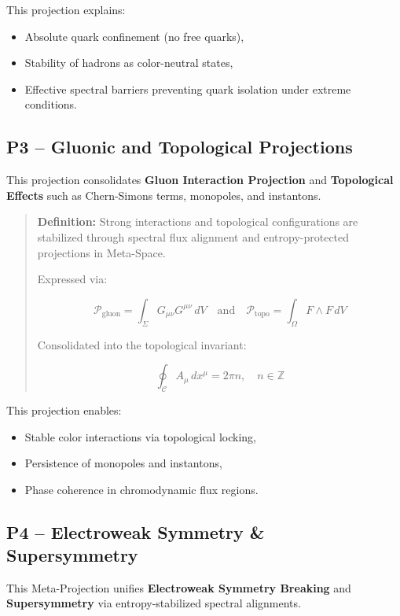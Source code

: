 \documentclass[10.5pt,a4paper]{article}
\begin{document}
This projection explains:
\begin{itemize}
    \item Absolute quark confinement (no free quarks),
    \item Stability of hadrons as color-neutral states,
    \item Effective spectral barriers preventing quark isolation under extreme conditions.
\end{itemize}

\subsection{P3 – Gluonic and Topological Projections}

This projection consolidates \textbf{Gluon Interaction Projection} and 
\textbf{Topological Effects} such as Chern-Simons terms, monopoles, and instantons.

\begin{quote}
\textbf{Definition:}  
Strong interactions and topological configurations are stabilized through spectral flux alignment 
and entropy-protected projections in Meta-Space.

Expressed via:

\[
\mathcal{P}_{\text{gluon}} = \int_\Sigma G_{\mu\nu} G^{\mu\nu} \, dV \quad \text{and} \quad \mathcal{P}_{\text{topo}} = \int_\Omega F \wedge F \, dV
\]

Consolidated into the topological invariant:

\[
\oint_{\mathcal{C}} A_\mu \, dx^\mu = 2\pi n, \quad n \in \mathbb{Z}
\]
\end{quote}

This projection enables:
\begin{itemize}
    \item Stable color interactions via topological locking,
    \item Persistence of monopoles and instantons,
    \item Phase coherence in chromodynamic flux regions.
\end{itemize}

\subsection{P4 – Electroweak Symmetry \& Supersymmetry}

This Meta-Projection unifies \textbf{Electroweak Symmetry Breaking} and \textbf{Supersymmetry} 
via entropy-stabilized spectral alignments.
\end{document}

